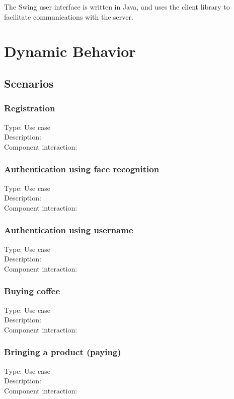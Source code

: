 \documentclass[11pt]{article}
\begin{document}
The Swing user interface is written in Java, and uses the client
library to facilitate communications with the server.


\section{Dynamic Behavior}
\subsection{Scenarios}

\subsubsection{Registration}
Type: Use case\\
Description:\\
Component interaction:\\
   
\subsubsection{Authentication using face recognition}
Type: Use case\\
Description:\\
Component interaction:\\
   
\subsubsection{Authentication using username}
Type: Use case\\
Description:\\
Component interaction:\\

\subsubsection{Buying coffee}
Type: Use case\\
Description:\\
Component interaction:\\

\subsubsection{Bringing a product (paying)}
Type: Use case\\
Description:\\
Component interaction:\\
\end{document}
